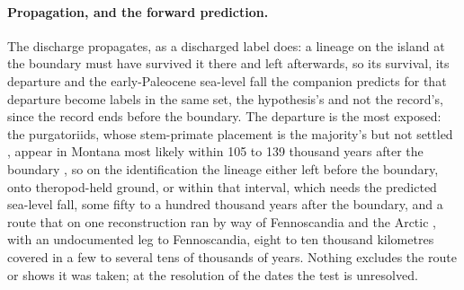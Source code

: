 \documentclass[11pt]{article}
\theoremstyle{definition}
\begin{document}
\paragraph{Propagation, and the forward prediction.} The discharge propagates, as a discharged label does: a lineage on the island at the boundary must have survived it there and left afterwards, so its survival, its departure and the early-Paleocene sea-level fall the companion predicts for that departure become labels in the same set, the hypothesis's and not the record's, since the record ends before the boundary. The departure is the most exposed: the purgatoriids, whose stem-primate placement is the majority's but not settled \cite{Halliday2017paleocene}, appear in Montana most likely within 105 to 139 thousand years after the boundary \cite{WilsonMantilla2021purgatoriids}, so on the identification the lineage either left before the boundary, onto theropod-held ground, or within that interval, which needs the predicted sea-level fall, some fifty to a hundred thousand years after the boundary, and a route that on one reconstruction ran by way of Fennoscandia and the Arctic \cite{Brikiatis2014deGeer}, with an undocumented leg to Fennoscandia, eight to ten thousand kilometres covered in a few to several tens of thousands of years. Nothing excludes the route or shows it was taken; at the resolution of the dates the test is unresolved.
\end{document}
